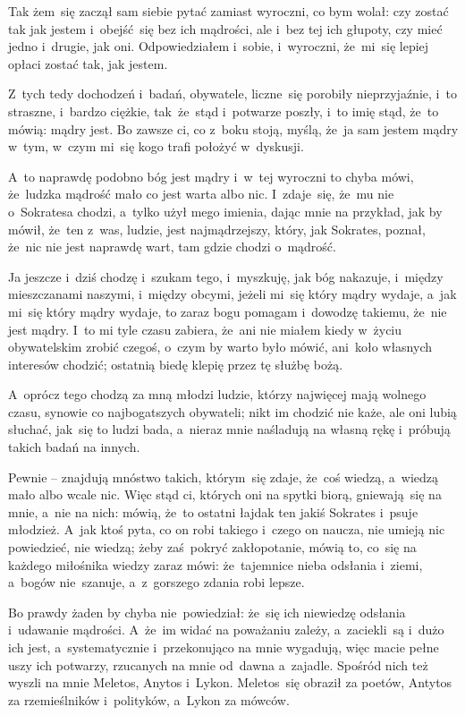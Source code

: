Tak żem~się zaczął sam siebie pytać zamiast wyroczni, co bym wolał:
czy zostać tak jak jestem i~obejść~się bez ich mądrości, ale i~bez tej
ich głupoty, czy mieć jedno i~drugie, jak oni. Odpowiedziałem i~sobie,
i~wyroczni, że~mi~się lepiej opłaci zostać tak, jak jestem.

Z~tych tedy dochodzeń i~badań, obywatele, liczne~się porobiły
nieprzyjaźnie, i~to straszne, i~bardzo ciężkie, tak~że~stąd i~potwarze
poszły, i~to imię stąd, że~to mówią: mądry jest. Bo zawsze ci, co
z~boku stoją, myślą, że~ja sam jestem mądry w~tym, w~czym mi~się kogo
trafi położyć w~dyskusji.

A~to naprawdę podobno bóg jest mądry i~w~tej wyroczni to chyba mówi, że~ludzka mądrość mało co jest warta albo nic. I~zdaje~się, że~mu nie o~Sokratesa chodzi, a~tylko użył mego imienia, dając mnie na przykład, jak by mówił, że~ten z~was, ludzie, jest najmądrzejszy, który, jak Sokrates, poznał, że~nic nie jest naprawdę wart, tam gdzie chodzi o~mądrość.

Ja jeszcze i~dziś chodzę i~szukam tego, i~myszkuję, jak bóg nakazuje, i~między mieszczanami naszymi, i~między obcymi, jeżeli mi~się który mądry wydaje, a~jak mi~się który mądry wydaje, to zaraz bogu pomagam i~dowodzę takiemu, że~nie jest mądry. I~to mi tyle czasu zabiera, że~ani nie miałem kiedy w~życiu obywatelskim zrobić czegoś, o~czym by warto było mówić, ani~koło własnych interesów chodzić; ostatnią biedę klepię przez tę służbę bożą.

A~oprócz tego chodzą za mną młodzi ludzie, którzy najwięcej mają
wolnego czasu, synowie co najbogatszych obywateli; nikt im chodzić nie
każe, ale oni lubią słuchać, jak~się to ludzi bada, a~nieraz mnie
naśladują na własną rękę i~próbują takich badań na innych.

Pewnie -- znajdują mnóstwo takich, którym~się zdaje, że~coś wiedzą,
a~wiedzą mało albo wcale nic. Więc stąd ci, których oni na spytki
biorą, gniewają~się na mnie, a~nie na nich: mówią, że~to ostatni
łajdak ten jakiś Sokrates i~psuje młodzież. A~jak ktoś pyta, co on robi takiego i~czego on naucza, nie umieją nic powiedzieć, nie wiedzą; żeby zaś~pokryć zakłopotanie, mówią to, co~się na każdego miłośnika wiedzy zaraz mówi: że~tajemnice nieba odsłania i~ziemi, a~bogów nie~szanuje, a~z~gorszego zdania robi lepsze.

Bo prawdy żaden by chyba nie~powiedział: że~się ich niewiedzę odsłania i~udawanie mądrości. A~że~im widać na poważaniu zależy, a~zaciekli~są i~dużo ich jest, a~systematycznie i~przekonująco na mnie wygadują, więc macie pełne uszy ich potwarzy, rzucanych na mnie od~dawna a~zajadle. Spośród nich też wyszli na mnie Meletos, Anytos i~Lykon. Meletos~się obraził za poetów, Antytos za rzemieślników i~polityków, a~Lykon za mówców.

